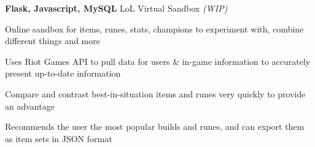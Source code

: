 \begin{cventries}
  \cventry
    {\textbf{Flask, Javascript, MySQL}} %
    {LoL Virtual Sandbox \textit{(WIP)}} %
    {} %
    {} %
    {
      \begin{cvitems} %
        \item {Online sandbox for items, runes, stats, champions to experiment with, combine different things and more}
        \item {Uses Riot Games API to pull data for users \& in-game information to accurately present up-to-date information}
        \item {Compare and contrast best-in-situation items and runes very quickly to provide an advantage}
        \item {Recommends the user the most popular builds and runes, and can export them as item sets in JSON format}
      \end{cvitems}
    }
    



\end{cventries}
